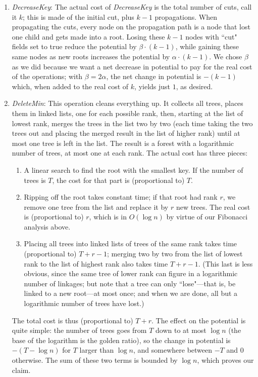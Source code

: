 \documentclass[11pt]{article}
\begin{document}
\begin{enumerate}
  \item \emph{DecreaseKey}:
    The actual cost of \emph{DecreaseKey} is the total number of cuts,
    call it $k$; this is made of the initial cut, plus $k-1$ propagations.
    When propagating the cuts, every node on the propagation path is a node
    that lost one child and gets made into a root.  Losing these $k-1$
    nodes with ``cut" fields set to true reduce the potential by
    $\beta\cdot (k-1)$, while gaining these same nodes as new roots
    increases the potential by $\alpha\cdot (k-1)$.  We chose $\beta$
    as we did because we want a net decrease in potential to pay for the real
    cost of the operations; with $\beta=2\alpha$, the net change in potential
    is $-(k-1)$ which, when added to the real cost of $k$, yields just $1$,
    as desired.
  \item \emph{DeleteMin}:
    This operation cleans everything up.   It collects all trees, places them
    in linked lists, one for each possible rank, then, starting at the list
    of lowest rank, merges the trees in the list two by two (each time
    taking the two trees out and placing the merged result in the list of
    higher rank) until at most one tree is left in the list.  The result
    is a forest with a logarithmic number of trees, at most one at each rank.
    The actual cost has three pieces:
    \begin{enumerate}
      \item A linear search to find the root with the smallest key.
        If the number of trees is $T$, the cost for that part is (proportional
        to) $T$.
      \item Ripping off the root takes constant time; if that root had
        rank $r$, we remove one tree from the list and replace it by $r$
        new trees.  The real cost is (proportional to) $r$, which is in
        $O(\log n)$ by virtue of our Fibonacci analysis above.
      \item Placing all trees into linked lists of trees of the same rank
        takes time (proportional to) $T+r-1$; merging two by two from the
        list of lowest rank to the list of highest rank also takes time $T+r-1$.
        (This last is less obvious, since the same tree of lower rank can figure
        in a logarithmic number of linkages; but note that a tree can only
        ``lose"---that is, be linked to a new root---at most once; and when
        we are done, all but a logarithmic number of trees have lost.)
    \end{enumerate}
    The total cost is thus (proportional to) $T+r$.
    The effect on the potential is quite simple: the number of trees goes from
    $T$ down to at most $\log n$ (the base of the logarithm is the golden
    ratio), so the change in potential is $-(T-\log n)$ for $T$ larger
    than $\log n$, and somewhere between $-T$ and 0 otherwise.
    The sum of these two terms is bounded by $\log n$, which proves our
    claim.
\end{enumerate}
\end{document}
